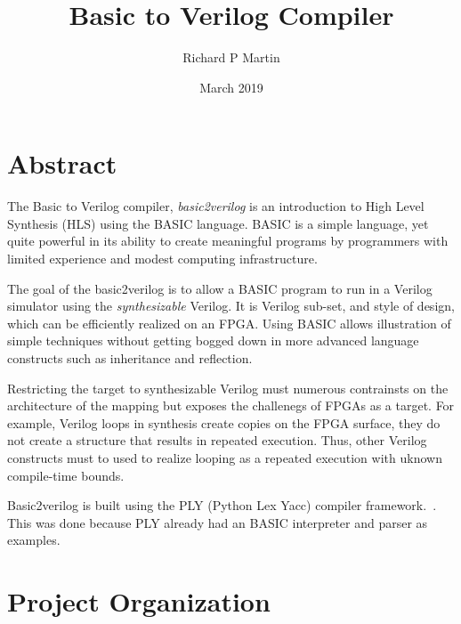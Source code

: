 \documentclass[10pt]{article}
\title{Basic to Verilog Compiler }
\author{Richard P Martin}
\date{March 2019}
\begin{document}
\maketitle

\section*{Abstract}


The Basic to Verilog compiler, {\em basic2verilog} is an introduction
to High Level Synthesis (HLS)  using the BASIC language. BASIC is a simple
language, yet quite powerful in its ability to create meaningful
programs by programmers with limited experience and modest computing
infrastructure.

The goal of the basic2verilog is to allow a BASIC program to run in a
Verilog simulator using the {\em synthesizable} Verilog. It is 
Verilog sub-set, and style of design, which can be efficiently realized on
an FPGA. Using BASIC allows illustration of simple techniques without
getting bogged down in more advanced language constructs such as
inheritance and reflection.

Restricting the target to synthesizable Verilog must numerous contrainsts
on the architecture of the mapping but exposes the challenegs of
FPGAs as a target. 
For example, Verilog loops in synthesis create copies on the
FPGA surface, they do not create a structure that results in
repeated execution. Thus, other Verilog constructs must to used
to realize looping as a repeated execution with uknown compile-time bounds. 

Basic2verilog is built using the PLY (Python Lex Yacc) compiler framework.~\cite{ply}. This was done because PLY already had an BASIC interpreter and
parser as examples. 

\section{Project Organization}
\end{document}

